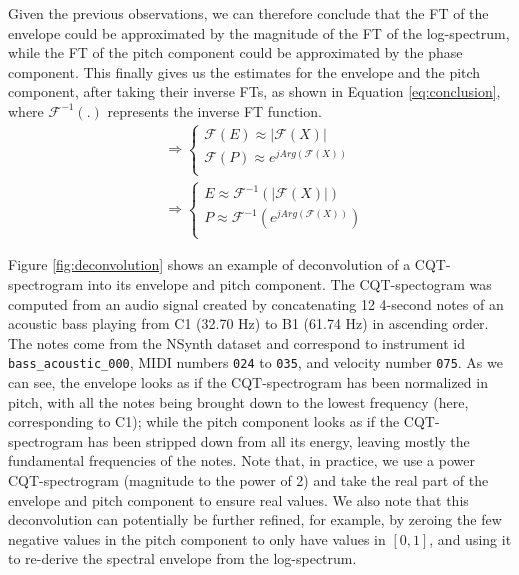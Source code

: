 \documentclass[journal]{IEEEtran}
\begin{document}
Given the previous observations, we can therefore conclude that the FT of the envelope could be approximated by the magnitude of the FT of the log-spectrum, while the FT of the pitch component could be approximated by the phase component. This finally gives us the estimates for the envelope and the pitch component, after taking their inverse FTs, as shown in Equation \ref{eq:conclusion}, where $\mathcal{F}^{-1}(.)$ represents the inverse FT function.
\begin{equation}
\label{eq:conclusion}
\begin{split}
& \Rightarrow 
\begin{cases}
\mathcal{F}(E) \approx |\mathcal{F}(X)| \\
\mathcal{F}(P) \approx e^{j Arg(\mathcal{F}(X))} \\
\end{cases} \\
& \Rightarrow
\begin{cases}
E \approx \mathcal{F}^{-1}(|\mathcal{F}(X)|) \\
P \approx \mathcal{F}^{-1}(e^{j Arg(\mathcal{F}(X))}) \\
\end{cases}
\end{split}
\end{equation}

Figure \ref{fig:deconvolution} shows an example of deconvolution of a CQT-spectrogram into its envelope and pitch component. The CQT-spectogram was computed from an audio signal created by concatenating 12 4-second notes of an acoustic bass playing from C1 (32.70 Hz) to B1 (61.74 Hz) in ascending order. The notes come from the NSynth dataset \cite{engel2017} and correspond to instrument id \texttt{bass\_acoustic\_000}, MIDI numbers \texttt{024} to \texttt{035}, and velocity number \texttt{075}. As we can see, the envelope looks as if the CQT-spectrogram has been normalized in pitch, with all the notes being brought down to the lowest frequency (here, corresponding to C1); while the pitch component looks as if the CQT-spectrogram has been stripped down from all its energy, leaving mostly the fundamental frequencies of the notes. Note that, in practice, we use a power CQT-spectrogram (magnitude to the power of 2) and take the real part of the envelope and pitch component to ensure real values. We also note that this deconvolution can potentially be further refined, for example, by zeroing the few negative values in the pitch component to only have values in $[0, 1]$, and using it to re-derive the spectral envelope from the log-spectrum.
\end{document}
